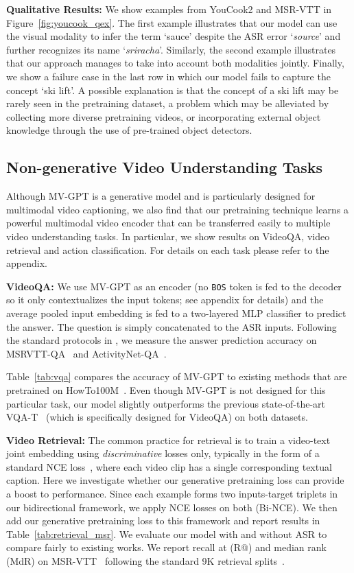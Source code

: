 \documentclass[10pt,twocolumn,letterpaper]{article}
\begin{document}
\noindent\textbf{Qualitative Results:} 
We show  examples from YouCook2 and MSR-VTT in Figure~\ref{fig:youcook_qex}.
The first example illustrates that our model can use the visual modality to infer the term `sauce' despite the ASR error `\textit{source}' and further recognizes its name `\textit{sriracha}'.
Similarly, the second example illustrates that our approach manages to take into account both modalities jointly. 
Finally, we show a failure case in the last row in which our model fails to capture the concept `ski lift'.
A possible explanation is that the concept of a ski lift may be rarely seen in the pretraining dataset, a problem which may be alleviated by collecting more diverse pretraining videos, or incorporating external object knowledge through the use of pre-trained object detectors. 




\subsection{Non-generative Video Understanding Tasks}
Although MV-GPT is a generative model and is particularly designed for multimodal video captioning, we also find that our pretraining technique learns a powerful multimodal video encoder that can be transferred easily to multiple video understanding tasks.
In particular, we show results on VideoQA, video retrieval and action classification.
For details on each task please refer to the appendix.


\noindent\textbf{VideoQA:} 
We use MV-GPT as an encoder (no \texttt{BOS} token is fed to the decoder so it only contextualizes the input tokens; see appendix for details) and the average pooled input embedding is fed to a two-layered MLP classifier to predict the answer.
The question is simply concatenated to the ASR inputs.
Following the standard protocols in \cite{yang2020just,seo2021look}, we measure the answer prediction accuracy on MSRVTT-QA~\cite{xu2017video} and ActivityNet-QA~\cite{yu2019activitynet}. 

Table~\ref{tab:vqa} compares the accuracy  of MV-GPT to existing methods that are pretrained on HowTo100M~\cite{miech2019howto100m}.
Even though MV-GPT is not designed for this particular task, our model slightly outperforms the previous state-of-the-art VQA-T~\cite{yang2020just} (which is specifically designed for VideoQA) on both datasets.

\noindent\textbf{Video Retrieval:} 
The common practice for retrieval is to train a video-text joint embedding using \textit{discriminative} losses only, typically in the form of a standard NCE loss~\cite{gutmann2010noise}, where each video clip has a single corresponding textual caption. Here we investigate whether our generative pretraining loss can provide a boost to performance.
Since each example forms two inputs-target triplets in our bidirectional framework, we apply NCE losses on both (Bi-NCE). We then add our generative pretraining loss to this framework and report results in Table~\ref{tab:retrieval_msr}. We evaluate our model with and without ASR to compare fairly to existing works.
We report recall at  (R@) and median rank (MdR) on MSR-VTT~\cite{xu2016msr} following the standard 9K retrieval splits~\cite{yu2018joint}.
\end{document}
